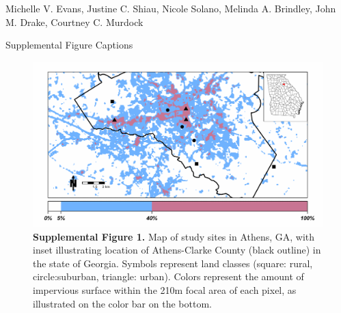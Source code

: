 \documentclass[12pt]{article}
\begin{document}
{\Large
\textbf{}}

\bigskip

Michelle V. Evans,
Justine C. Shiau,
Nicole Solano,
Melinda A. Brindley,
John M. Drake,
Courtney C. Murdock
\smallskip

{\Large{Supplemental Figure Captions}}

\begin{figure}[h]
\centering
\includegraphics[width=6in]{SuppFig1.pdf}
\caption{\textbf{Supplemental Figure 1.} Map of study sites in Athens, GA, with inset illustrating location of Athens-Clarke County (black outline) in the state of Georgia. Symbols represent land classes (square: rural, circle:suburban, triangle: urban). Colors represent the amount of impervious surface within the 210m focal area of each pixel, as illustrated on the color bar on the bottom.}
\end{figure}
\end{document}
